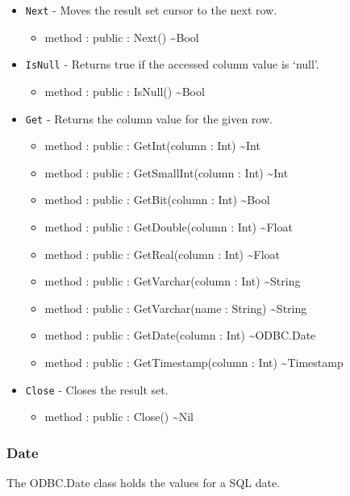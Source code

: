 \documentclass[11pt]{article}
\begin{document}
\begin{itemize}
\item \texttt{Next} - Moves the result set cursor to the next row.
  \begin{itemize}
  \item method : public : Next() \textasciitilde Bool
  \end{itemize}
\item \texttt{IsNull} - Returns true if the accessed column value is `null'.
  \begin{itemize}
  \item method : public : IsNull() \textasciitilde Bool
  \end{itemize}

\item \texttt{Get} - Returns the column value for the given row.
  \begin{itemize}
  \item method : public : GetInt(column : Int) \textasciitilde Int
  \item method : public : GetSmallInt(column : Int) \textasciitilde Int
  \item method : public : GetBit(column : Int) \textasciitilde Bool
  \item method : public : GetDouble(column : Int) \textasciitilde Float
  \item method : public : GetReal(column : Int) \textasciitilde Float
  \item method : public : GetVarchar(column : Int) \textasciitilde String
  \item method : public : GetVarchar(name : String) \textasciitilde String
  \item method : public : GetDate(column : Int) \textasciitilde ODBC.Date
  \item method : public : GetTimestamp(column : Int) \textasciitilde Timestamp 
  \end{itemize}
\item \texttt{Close} - Closes the result set.
  \begin{itemize}
  \item method : public : Close() \textasciitilde Nil
  \end{itemize}
\end{itemize}

\subsubsection{Date}
The ODBC.Date class holds the values for a SQL date.
\end{document}
